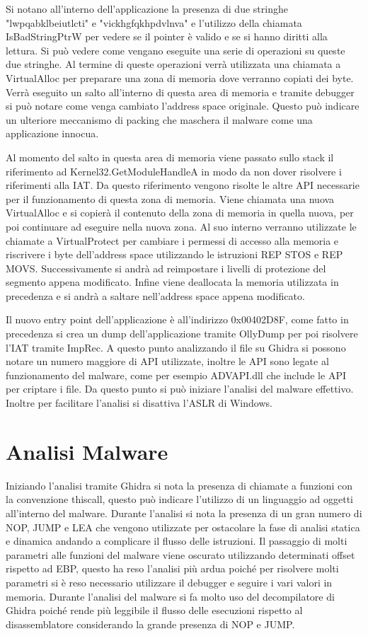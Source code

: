 \documentclass[a4paper,12pt]{article}
\begin{document}
Si notano all'interno dell'applicazione la presenza di due stringhe "lwpqabklbeiutlcti" e "vickhgfqkhpdvlnva" e l'utilizzo della chiamata IsBadStringPtrW per vedere se il pointer è valido e se si hanno diritti alla lettura. Si può vedere come vengano eseguite una serie di operazioni su queste due stringhe. Al termine di queste operazioni verrà utilizzata una chiamata a VirtualAlloc per preparare una zona di memoria dove verranno copiati dei byte.  Verrà eseguito un salto all'interno di questa area di memoria e tramite debugger si può notare come venga cambiato l'address space originale. Questo può indicare un ulteriore meccanismo di packing che maschera il malware come una applicazione innocua.

Al momento del salto in questa area di memoria viene passato sullo stack il riferimento ad Kernel32.GetModuleHandleA in modo da non dover risolvere i riferimenti alla IAT. Da questo riferimento vengono risolte le altre API necessarie per il funzionamento di questa zona di memoria. Viene chiamata una nuova VirtualAlloc e si copierà il contenuto della zona di memoria in quella nuova, per poi continuare ad eseguire nella nuova zona. Al suo interno verranno utilizzate le chiamate a VirtualProtect per cambiare i permessi di accesso alla memoria e riscrivere i byte dell'address space utilizzando le istruzioni REP STOS e REP MOVS. Successivamente si andrà ad reimpostare i livelli di protezione del segmento appena modificato. Infine viene deallocata la memoria utilizzata in precedenza e si andrà a saltare nell'address space appena modificato.

Il nuovo entry point dell'applicazione è all'indirizzo 0x00402D8F, come fatto in precedenza si crea un dump dell'applicazione tramite OllyDump per poi risolvere l'IAT tramite ImpRec. A questo punto analizzando il file su Ghidra si possono notare un numero maggiore di API utilizzate, inoltre le API sono legate al funzionamento del malware, come per esempio ADVAPI.dll che include le API per criptare i file. Da questo punto si può iniziare l'analisi del malware effettivo. Inoltre per facilitare l'analisi si disattiva l'ASLR di Windows.

\section{Analisi Malware}
Iniziando l'analisi tramite Ghidra si nota la presenza di chiamate a funzioni con la convenzione thiscall, questo può indicare l'utilizzo di un linguaggio ad oggetti all'interno del malware. Durante l'analisi si nota la presenza di un gran numero di NOP, JUMP e LEA che vengono utilizzate per ostacolare la fase di analisi statica e dinamica andando a complicare il flusso delle istruzioni.  Il passaggio di molti parametri alle funzioni del malware viene oscurato utilizzando determinati offset rispetto ad EBP, questo ha reso l'analisi più ardua poiché per risolvere molti parametri si è reso necessario utilizzare il debugger e seguire i vari valori in memoria. Durante l'analisi del malware si fa molto uso del decompilatore di Ghidra poiché rende più leggibile il flusso delle esecuzioni rispetto al disassemblatore considerando la grande presenza di NOP e JUMP.
\end{document}
